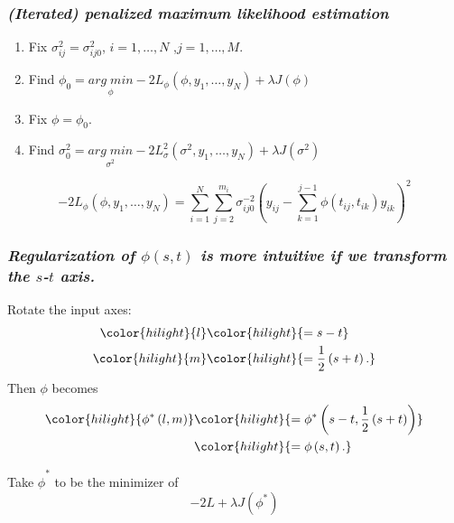 \documentclass[12pt]{beamer}
\newcommand{\newmaththought}[1]{{ \color{hilight} {#1}}}
\begin{document}
\begin{frame}
\frametitle{\emph{(Iterated) penalized maximum likelihood estimation}}

\begin{enumerate}
\item Fix $\sigma_{ij}^2 = \sigma_{ij0}^2$, $i=1,\dots,N$ ,$j=1,\dots,M$.
\item Find $\phi_0 = \underset{\phi}{arg \; min} -2L_\phi\left(\phi, y_1,\dots, y_N \right) + \lambda J\left( \phi \right)$
\item Fix $\phi = \phi_{0}$.
\item Find  $\sigma_{0}^2 = \underset{\sigma^2}{arg\; min} -2L_\sigma^2\left(\sigma^2, y_1,\dots, y_N \right) + \lambda J\left( \sigma^2 \right)$
\end{enumerate}

\begin{adjustwidth}{-2cm}{-2cm}
\begin{equation}
-2 L_\phi\left(\phi, y_1, \dots,y_N \right) = \sum_{i=1}^N \sum_{j=2}^{m_i} \sigma_{ij0}^{-2} \left(y_{ij} - \sum_{k=1}^{j-1}\phi\left({t_{ij},t_{ik}}\right)y_{ik} \right)^2 \label{loglikelihood}
\end{equation}
\end{adjustwidth}
\end{frame}




\begin{frame}
\frametitle{\emph{Regularization of $\phi\left(s,t\right)$ is more intuitive if we transform the $s$-$t$ axis. }}
Rotate the input axes:
\begin{align*}
\newmaththought{l} &\newmaththought{= s-t} \\
\newmaththought{m} &\newmaththought{= \frac{1}{2}\left(s+t\right).}
\end{align*}
\noindent
Then $\phi$ becomes
\begin{align*}
\newmaththought{\phi^*\left(l,m\right)} &\newmaththought{= \phi^*\left(s-t, \frac{1}{2}\left(s+t\right)\right)}\\
 &\newmaththought{= \phi\left(s,t\right).}
\end{align*}

Take $\hat{\phi}^*$ to be the minimizer of 
\[
-2L + \lambda J\left(\phi^*\right)
\]

\end{frame}
\end{document}
